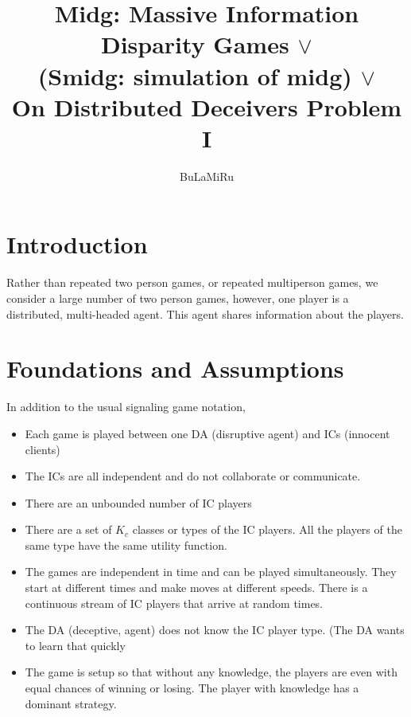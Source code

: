 \documentclass{article}
\begin{document}
\title{Midg:  Massive Information Disparity Games $\vee$ \\
 (Smidg:  simulation of midg)  $\vee$ \\ 
On Distributed Deceivers Problem I
}
\author{ BuLaMiRu}
\maketitle


\section{Introduction}
Rather than repeated two person games, or repeated multiperson games,
we consider a large number of two person games, however, one player is
a distributed, multi-headed agent.  This agent  shares information
about the players.

\section{Foundations and Assumptions}


In addition to the usual signaling game notation, 

\begin{itemize}
\item Each game is played between one DA (disruptive agent) and ICs (innocent clients)

\item The ICs are all independent and do not collaborate or
  communicate.

\item There are an unbounded number of IC players

\item There are a set of  $K_c$ classes or types of the IC players.  All the players of the same type 
have the same utility function. 

\item The games are independent in time and can be played
  simultaneously.  They start at different times and make moves at
  different speeds.  There is a continuous stream of IC players that
  arrive at random times.

\item The DA (deceptive, agent) does not know the IC player type.
  (The DA wants to learn that quickly

\item  The game is setup so that without any knowledge, the players
  are even with equal chances of winning or losing.   The player with
  knowledge has a dominant strategy.
\end{itemize}
\end{document}
